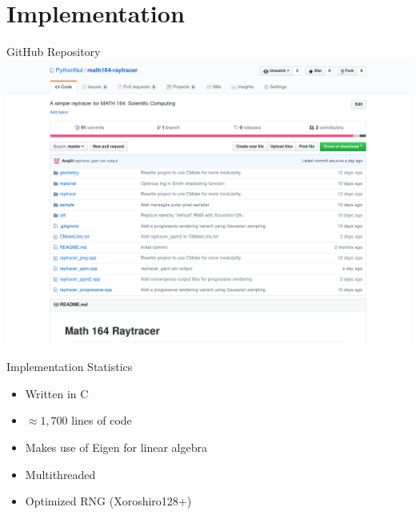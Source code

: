 \documentclass[10pt]{beamer}
\newcommand{\CC}{C\nolinebreak\hspace{-.05em}\raisebox{.4ex}{\tiny\bf +}\nolinebreak\hspace{-.10em}\raisebox{.4ex}{\tiny\bf +}}
\def\CC{{C\nolinebreak[4]\hspace{-.05em}\raisebox{.4ex}{\tiny\bf ++}}}
\begin{document}
\section{Implementation}

\begin{frame}{GitHub Repository}
  \includegraphics[width=\paperwidth, center]{github.png}
\end{frame}

\begin{frame}{Implementation Statistics}
  \begin{itemize}
  \item Written in \CC
  \item \(\approx 1,700\) lines of code
  \item Makes use of Eigen for linear algebra
  \item Multithreaded
  \item Optimized RNG (Xoroshiro128+)
  \end{itemize}
\end{frame}
\end{document}
